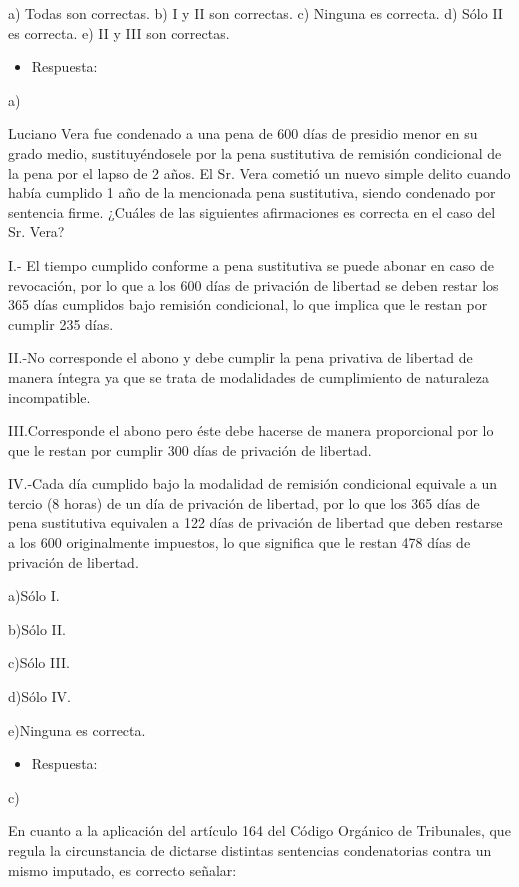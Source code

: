 \documentclass[letterpaper, 11pt]{article}
\begin{document}
a) Todas son correctas.
b) I y II son correctas.
c) Ninguna es correcta.
d) Sólo II es correcta.
e) II y III son correctas.

\begin{itemize}
\item Respuesta:
\end{itemize}
a)

Luciano Vera fue condenado a una pena de 600 días de presidio menor en su grado
medio, sustituyéndosele por la pena sustitutiva de remisión condicional de la pena
por el lapso de 2 años. El Sr. Vera cometió un nuevo simple delito cuando había
cumplido 1 año de la mencionada pena sustitutiva, siendo condenado por
sentencia firme. ¿Cuáles de las siguientes afirmaciones es correcta en el caso del
Sr. Vera?

I.- El tiempo cumplido conforme a pena sustitutiva se puede abonar en caso de
revocación, por lo que a los 600 días de privación de libertad se deben restar los
365 días cumplidos bajo remisión condicional, lo que implica que le restan por
cumplir 235 días.

II.-No corresponde el abono y debe cumplir la pena privativa de libertad de manera
íntegra ya que se trata de modalidades de cumplimiento de naturaleza
incompatible.

III.Corresponde el abono pero éste debe hacerse de manera proporcional por lo que
le restan por cumplir 300 días de privación de libertad.

IV.-Cada día cumplido bajo la modalidad de remisión condicional equivale a un tercio
(8 horas) de un día de privación de libertad, por lo que los 365 días de pena
sustitutiva equivalen a 122 días de privación de libertad que deben restarse a los
600 originalmente impuestos, lo que significa que le restan 478 días de privación
de libertad.

a)Sólo I.

b)Sólo II.

c)Sólo III.

d)Sólo IV.

e)Ninguna es correcta.

\begin{itemize}
\item Respuesta:
\end{itemize}
c)



En cuanto a la aplicación del artículo 164 del Código Orgánico de Tribunales, que
regula la circunstancia de dictarse distintas sentencias condenatorias contra un
mismo imputado, es correcto señalar:
\end{document}
